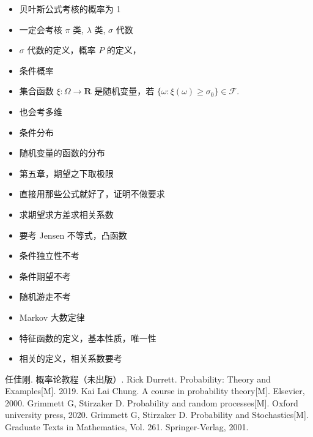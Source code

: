 \begin{itemize}
    \item 贝叶斯公式考核的概率为 1
    \item 一定会考核 $\pi$ 类, $\lambda$ 类, $\sigma$ 代数
    \item $\sigma$ 代数的定义，概率 $P$ 的定义，
    \item 条件概率
    \item 集合函数 $\xi:\Omega \to \mathbf{R}$ 是随机变量，若 $\{ \omega:\xi (\omega)\geq\sigma_{0} \}\in \mathcal{F}$.
    \item 也会考多维
    \item 条件分布
    \item 随机变量的函数的分布
    \item 第五章，期望之下取极限
    \item 直接用那些公式就好了，证明不做要求
    \item 求期望求方差求相关系数
    \item 要考 Jensen 不等式，凸函数
    \item 条件独立性不考
    \item 条件期望不考
    \item 随机游走不考
    \item Markov 大数定律
    \item 特征函数的定义，基本性质，唯一性
    \item 相关的定义，相关系数要考
\end{itemize}









\begin{thebibliography}{99}
     任佳刚. 概率论教程（未出版）.
     Rick Durrett. Probability: Theory and Examples[M]. 2019.
     Kai Lai Chung. A course in probability theory[M]. Elsevier, 2000.
     Grimmett G, Stirzaker D. Probability and random processes[M]. Oxford university press, 2020.
     Grimmett G, Stirzaker D. Probability and Stochastics[M]. Graduate Texts in Mathematics, Vol. 261. Springer-Verlag, 2001.
\end{thebibliography}

